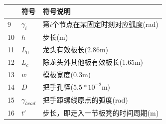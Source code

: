 \documentclass[withoutpreface,bwprint]{cumcmthesis}
\newcommand{\headcol}[1]{\textbf{#1}} %
\begin{document}
\begin{table}[htb!]
	\centering
	\small
	\begin{tabular}{p{60pt}<{\centering}|p{60pt}<{\centering}p{180pt}<{\raggedright}}
		\hline
		\rowcolor{gray!25} %
		\headcol \textbf{序号} & \textbf{符号} & \textbf{符号说明} \\
		\hline
		9 & $\gamma_i$ & 第$i$个节点在某固定时刻对应弧度(rad) \\
		10 & $h$ & 步长(m) \\
		11 & $L_0$ & 龙头有效板长(2.86m) \\
		12 & $L_c$ & 除龙头外其他板有效板长(1.65m) \\
		13 & $w$& 模板宽度(0.3m)\\
		14 & $D$& 把手孔径($5.5*10^{-2}$m)\\
		15 & $\gamma_{head}$ & 把手距螺线原点的弧度(rad) \\
		16 & $t'$ & 步长，即走入一节板凳的时间周期(m)  \\
		\hline
	\end{tabular}
	\label{symbol1}
\end{table}
\end{document}
